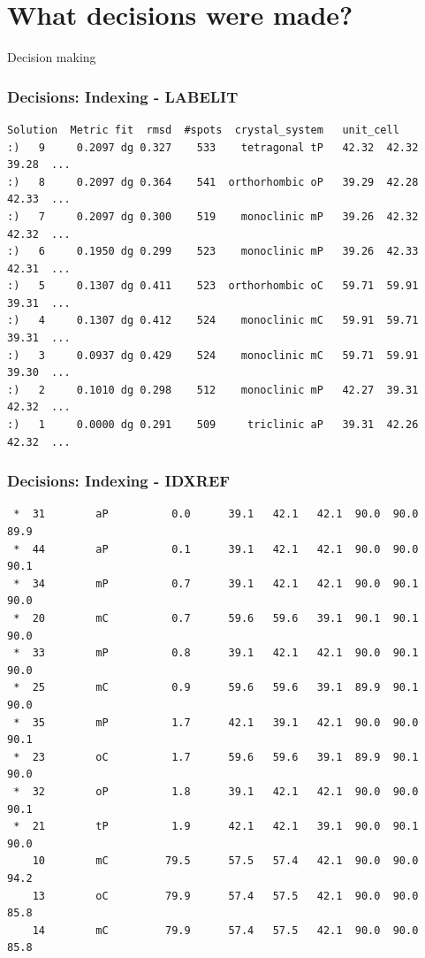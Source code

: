 \documentclass[slides,compress]{beamer}
\begin{document}
\section{What decisions were made?}

\begin{frame}
\begin{center}
\Huge Decision making
\end{center}
\end{frame}

\begin{frame}[fragile]
\frametitle{Decisions: Indexing - LABELIT}
{\small
\begin{verbatim}
Solution  Metric fit  rmsd  #spots  crystal_system   unit_cell 
:)   9     0.2097 dg 0.327    533    tetragonal tP   42.32  42.32  39.28  ...
:)   8     0.2097 dg 0.364    541  orthorhombic oP   39.29  42.28  42.33  ...
:)   7     0.2097 dg 0.300    519    monoclinic mP   39.26  42.32  42.32  ...
:)   6     0.1950 dg 0.299    523    monoclinic mP   39.26  42.33  42.31  ...
:)   5     0.1307 dg 0.411    523  orthorhombic oC   59.71  59.91  39.31  ...
:)   4     0.1307 dg 0.412    524    monoclinic mC   59.91  59.71  39.31  ...
:)   3     0.0937 dg 0.429    524    monoclinic mC   59.71  59.91  39.30  ...
:)   2     0.1010 dg 0.298    512    monoclinic mP   42.27  39.31  42.32  ...
:)   1     0.0000 dg 0.291    509     triclinic aP   39.31  42.26  42.32  ...
\end{verbatim}
}
\end{frame}

\begin{frame}[fragile]
\frametitle{Decisions: Indexing - IDXREF}
{\small
\begin{verbatim}
 *  31        aP          0.0      39.1   42.1   42.1  90.0  90.0  89.9
 *  44        aP          0.1      39.1   42.1   42.1  90.0  90.0  90.1
 *  34        mP          0.7      39.1   42.1   42.1  90.0  90.1  90.0
 *  20        mC          0.7      59.6   59.6   39.1  90.1  90.1  90.0
 *  33        mP          0.8      39.1   42.1   42.1  90.0  90.1  90.0
 *  25        mC          0.9      59.6   59.6   39.1  89.9  90.1  90.0
 *  35        mP          1.7      42.1   39.1   42.1  90.0  90.0  90.1
 *  23        oC          1.7      59.6   59.6   39.1  89.9  90.1  90.0
 *  32        oP          1.8      39.1   42.1   42.1  90.0  90.0  90.1
 *  21        tP          1.9      42.1   42.1   39.1  90.0  90.1  90.0
    10        mC         79.5      57.5   57.4   42.1  90.0  90.0  94.2
    13        oC         79.9      57.4   57.5   42.1  90.0  90.0  85.8
    14        mC         79.9      57.4   57.5   42.1  90.0  90.0  85.8
\end{verbatim}
}
\end{frame}
\end{document}
